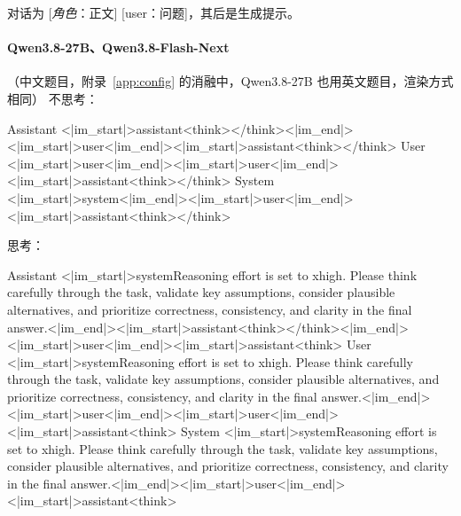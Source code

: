 对话为 [\textit{角色}：正文] [user：问题]，其后是生成提示。

\paragraph{Qwen3.8-27B、Qwen3.8-Flash-Next} （中文题目，附录~\ref{app:config} 的消融中，Qwen3.8-27B 也用英文题目，渲染方式相同）
\noindent 不思考：
\begin{Rendering}
Assistant  <|im_start|>assistant\NL{}<think>\NL{}\NL{}</think>\NL{}\NL{}<|im_end|>\NL{}<|im_start|>user\NL{}<|im_end|>\NL{}<|im_start|>assistant\NL{}<think>\NL{}\NL{}</think>\NL{}\NL{}
User       <|im_start|>user\NL{}<|im_end|>\NL{}<|im_start|>user\NL{}<|im_end|>\NL{}<|im_start|>assistant\NL{}<think>\NL{}\NL{}</think>\NL{}\NL{}
System     <|im_start|>system\NL{}<|im_end|>\NL{}<|im_start|>user\NL{}<|im_end|>\NL{}<|im_start|>assistant\NL{}<think>\NL{}\NL{}</think>\NL{}\NL{}
\end{Rendering}
\noindent 思考：
\begin{Rendering}
Assistant  <|im_start|>system\NL{}Reasoning effort is set to xhigh. Please think carefully through the task, validate key assumptions, consider plausible alternatives, and prioritize correctness, consistency, and clarity in the final answer.<|im_end|>\NL{}<|im_start|>assistant\NL{}<think>\NL{}\NL{}</think>\NL{}\NL{}<|im_end|>\NL{}<|im_start|>user\NL{}<|im_end|>\NL{}<|im_start|>assistant\NL{}<think>\NL{}
User       <|im_start|>system\NL{}Reasoning effort is set to xhigh. Please think carefully through the task, validate key assumptions, consider plausible alternatives, and prioritize correctness, consistency, and clarity in the final answer.<|im_end|>\NL{}<|im_start|>user\NL{}<|im_end|>\NL{}<|im_start|>user\NL{}<|im_end|>\NL{}<|im_start|>assistant\NL{}<think>\NL{}
System     <|im_start|>system\NL{}Reasoning effort is set to xhigh. Please think carefully through the task, validate key assumptions, consider plausible alternatives, and prioritize correctness, consistency, and clarity in the final answer.\NL{}\NL{}<|im_end|>\NL{}<|im_start|>user\NL{}<|im_end|>\NL{}<|im_start|>assistant\NL{}<think>\NL{}
\end{Rendering}
